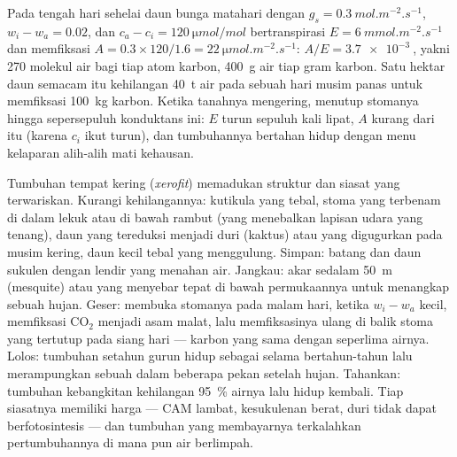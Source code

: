 \begin{example}\label{ex:b2:plant-plasticity:wue}
Pada tengah hari sehelai daun bunga matahari dengan $g_s = \qty{0.3}{mol.m^{-2}.s^{-1}}$,
$w_i - w_a = 0.02$, dan $c_a - c_i = \qty{120}{\micro mol/mol}$
bertranspirasi $E = \qty{6}{mmol.m^{-2}.s^{-1}}$ dan memfiksasi $A =
0.3\times 120/1.6 = \qty{22}{\micro mol.m^{-2}.s^{-1}}$: $A/E =
\qty{3.7e-3}{}$, yakni 270 molekul air bagi tiap atom karbon,
\qty{400}{g} air tiap gram karbon. Satu hektar daun semacam itu
kehilangan \qty{40}{t} air pada sebuah hari musim panas untuk
memfiksasi \qty{100}{kg} karbon. Ketika tanahnya mengering,  menutup stomanya hingga sepersepuluh konduktans ini: $E$ turun
sepuluh kali lipat, $A$ kurang dari itu (karena $c_i$ ikut turun), dan
tumbuhannya bertahan hidup dengan menu kelaparan alih-alih mati
kehausan.
\end{example}

\begin{proposition}\label{prop:b2:plant-plasticity:xerophytes}
Tumbuhan tempat kering (\emph{xerofit}) memadukan struktur dan siasat
yang terwariskan. Kurangi kehilangannya: kutikula yang tebal, stoma
yang terbenam di dalam lekuk atau di bawah rambut (yang menebalkan
lapisan udara yang tenang), daun yang tereduksi menjadi duri (kaktus)
atau yang digugurkan pada musim kering, daun kecil tebal yang
menggulung. Simpan: batang dan daun sukulen dengan lendir yang menahan
air. Jangkau: akar sedalam \qty{50}{m} (mesquite) atau yang menyebar
tepat di bawah permukaannya untuk menangkap sebuah hujan. Geser:
 membuka stomanya pada malam hari, ketika $w_i - w_a$
kecil, memfiksasi $\mathrm{CO_2}$ menjadi asam malat, lalu
memfiksasinya ulang di balik stoma yang tertutup pada siang hari ---
karbon yang sama dengan seperlima airnya. Lolos: tumbuhan setahun gurun
hidup sebagai  selama bertahun-tahun lalu merampungkan sebuah  dalam beberapa pekan setelah hujan. Tahankan: tumbuhan kebangkitan
kehilangan \qty{95}{\%} airnya lalu hidup kembali. Tiap siasatnya
memiliki harga --- CAM lambat, kesukulenan berat, duri tidak dapat
berfotosintesis --- dan tumbuhan yang membayarnya terkalahkan
pertumbuhannya di mana pun air berlimpah.
\end{proposition}


